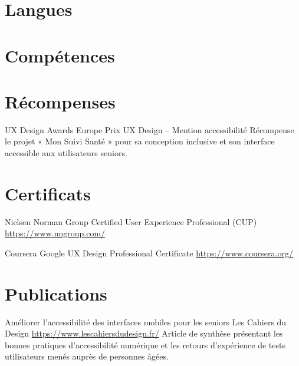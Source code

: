 \documentclass[a4paper, serif, 10pt]{moderncv}
\begin{document}
\section{Langues}

\section{Compétences}

\section{Récompenses}

        {UX Design Awards Europe}
        {Prix UX Design – Mention accessibilité}
        {}
        {}
        {Récompense le projet « Mon Suivi Santé » pour sa conception inclusive et son interface accessible aux utilisateurs seniors.}
\section{Certificats}

        {Nielsen Norman Group}
        {Certified User Experience Professional (CUP)}
        {\url{https://www.nngroup.com/}}
        {}
        {}

        {Coursera}
        {Google UX Design Professional Certificate}
        {\url{https://www.coursera.org/}}
        {}
        {}
\section{Publications}

        {Améliorer l'accessibilité des interfaces mobiles pour les seniors}
        {Les Cahiers du Design}
        {\url{https://www.lescahiersdudesign.fr/}}
        {}
        {Article de synthèse présentant les bonnes pratiques d'accessibilité numérique et les retours d'expérience de tests utilisateurs menés auprès de personnes âgées.}
\end{document}
